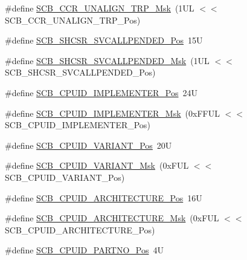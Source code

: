 \begin{DoxyCompactItemize}
\item 
\#define \hyperlink{group___c_m_s_i_s___s_c_b_ga68c96ad594af70c007923979085c99e0}{S\-C\-B\-\_\-\-C\-C\-R\-\_\-\-U\-N\-A\-L\-I\-G\-N\-\_\-\-T\-R\-P\-\_\-\-Msk}~(1\-U\-L $<$$<$ S\-C\-B\-\_\-\-C\-C\-R\-\_\-\-U\-N\-A\-L\-I\-G\-N\-\_\-\-T\-R\-P\-\_\-\-Pos)
\item 
\#define \hyperlink{group___c_m_s_i_s___s_c_b_ga2f93ec9b243f94cdd3e94b8f0bf43641}{S\-C\-B\-\_\-\-S\-H\-C\-S\-R\-\_\-\-S\-V\-C\-A\-L\-L\-P\-E\-N\-D\-E\-D\-\_\-\-Pos}~15\-U
\item 
\#define \hyperlink{group___c_m_s_i_s___s_c_b_ga6095a7acfbad66f52822b1392be88652}{S\-C\-B\-\_\-\-S\-H\-C\-S\-R\-\_\-\-S\-V\-C\-A\-L\-L\-P\-E\-N\-D\-E\-D\-\_\-\-Msk}~(1\-U\-L $<$$<$ S\-C\-B\-\_\-\-S\-H\-C\-S\-R\-\_\-\-S\-V\-C\-A\-L\-L\-P\-E\-N\-D\-E\-D\-\_\-\-Pos)
\item 
\#define \hyperlink{group___c_m_s_i_s___s_c_b_ga58686b88f94f789d4e6f429fe1ff58cf}{S\-C\-B\-\_\-\-C\-P\-U\-I\-D\-\_\-\-I\-M\-P\-L\-E\-M\-E\-N\-T\-E\-R\-\_\-\-Pos}~24\-U
\item 
\#define \hyperlink{group___c_m_s_i_s___s_c_b_ga0932b31faafd47656a03ced75a31d99b}{S\-C\-B\-\_\-\-C\-P\-U\-I\-D\-\_\-\-I\-M\-P\-L\-E\-M\-E\-N\-T\-E\-R\-\_\-\-Msk}~(0x\-F\-F\-U\-L $<$$<$ S\-C\-B\-\_\-\-C\-P\-U\-I\-D\-\_\-\-I\-M\-P\-L\-E\-M\-E\-N\-T\-E\-R\-\_\-\-Pos)
\item 
\#define \hyperlink{group___c_m_s_i_s___s_c_b_ga104462bd0815391b4044a70bd15d3a71}{S\-C\-B\-\_\-\-C\-P\-U\-I\-D\-\_\-\-V\-A\-R\-I\-A\-N\-T\-\_\-\-Pos}~20\-U
\item 
\#define \hyperlink{group___c_m_s_i_s___s_c_b_gad358dfbd04300afc1824329d128b99e8}{S\-C\-B\-\_\-\-C\-P\-U\-I\-D\-\_\-\-V\-A\-R\-I\-A\-N\-T\-\_\-\-Msk}~(0x\-F\-U\-L $<$$<$ S\-C\-B\-\_\-\-C\-P\-U\-I\-D\-\_\-\-V\-A\-R\-I\-A\-N\-T\-\_\-\-Pos)
\item 
\#define \hyperlink{group___c_m_s_i_s___s_c_b_gaf8b3236b08fb8e840efb682645fb0e98}{S\-C\-B\-\_\-\-C\-P\-U\-I\-D\-\_\-\-A\-R\-C\-H\-I\-T\-E\-C\-T\-U\-R\-E\-\_\-\-Pos}~16\-U
\item 
\#define \hyperlink{group___c_m_s_i_s___s_c_b_gafae4a1f27a927338ae9dc51a0e146213}{S\-C\-B\-\_\-\-C\-P\-U\-I\-D\-\_\-\-A\-R\-C\-H\-I\-T\-E\-C\-T\-U\-R\-E\-\_\-\-Msk}~(0x\-F\-U\-L $<$$<$ S\-C\-B\-\_\-\-C\-P\-U\-I\-D\-\_\-\-A\-R\-C\-H\-I\-T\-E\-C\-T\-U\-R\-E\-\_\-\-Pos)
\item 
\#define \hyperlink{group___c_m_s_i_s___s_c_b_ga705f68eaa9afb042ca2407dc4e4629ac}{S\-C\-B\-\_\-\-C\-P\-U\-I\-D\-\_\-\-P\-A\-R\-T\-N\-O\-\_\-\-Pos}~4\-U
\item 
$$
\end{DoxyCompactItemize}
